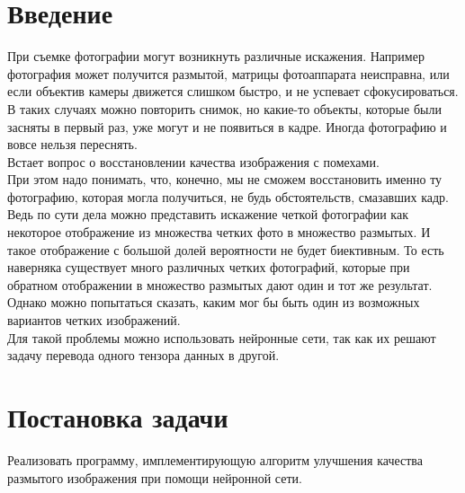 \documentclass{article}
\begin{document}
\section*{Введение}
При съемке фотографии могут возникнуть различные искажения. Например фотография может получится размытой, матрицы фотоаппарата неисправна, или если объектив камеры движется слишком быстро, и не успевает сфокусироваться. В таких случаях можно повторить снимок, но какие-то объекты, которые были засняты в первый раз, уже могут и не появиться в кадре. Иногда фотографию и вовсе нельзя переснять. \\ Встает вопрос о восстановлении качества изображения с помехами.\\
При этом надо понимать, что, конечно, мы не сможем восстановить именно ту фотографию, которая могла получиться, не будь обстоятельств, смазавших кадр. Ведь по сути дела можно представить искажение четкой фотографии как некоторое отображение из множества четких фото в множество размытых. И такое отображение с большой долей вероятности не будет биективным. То есть наверняка существует много различных четких фотографий, которые при обратном отображении в множество размытых дают один и тот же результат.
 \\ Однако можно попытаться сказать, каким мог бы быть один из возможных вариантов четких изображений. \\
Для такой проблемы можно использовать нейронные сети, так как их решают задачу перевода одного тензора данных в другой.

\section*{Постановка задачи}
Реализовать программу, имплементирующую алгоритм улучшения качества размытого изображения при помощи нейронной сети. 

\end{document}
